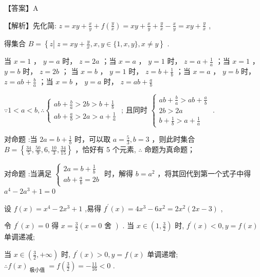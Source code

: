 \documentclass[10pt]{article}
\newcommand*\circled[1]{\tikz[baseline=(char.base)]{\node[shape=circle,draw,inner sep=1.5pt] (char) {\small #1};}}
\begin{document}
【答案】A

【解析】先化简: \(z = {xy} + \frac{x}{y} + f\left( \frac{y}{x}\right)  = {xy} + \frac{x}{y} + \frac{y}{x} - \frac{x}{y} = {xy} + \frac{y}{x}\) ,

得集合 \(B = \left\{  {z\left| {\;z = {xy} + \frac{y}{x}}\right. ,x,y \in  \{ 1,x,y\} ,x \neq  y}\right\}\) .

当 \(x = 1\) ， \(y = a\) 时， \(z = {2a}\) ；当 \(x = a\) ， \(y = 1\) 时， \(z = a + \frac{1}{a}\) ；当 \(x = 1\) ， \(y = b\) 时， \(z = {2b}\) ； 当 \(x = b\) ， \(y = 1\) 时， \(z = b + \frac{1}{b}\) ；当 \(x = a\) ， \(y = b\) 时， \(z = {ab} + \frac{b}{a}\) ；当 \(x = b\) ， \(y = a\) 时， \(z = {ab} + \frac{a}{b}\)

\(\because 1 < a < b,\therefore \left\{  \begin{array}{l} {ab} + \frac{b}{a} > {2b} > b + \frac{1}{b} \\  {ab} + \frac{a}{b} > {2a} > a + \frac{1}{a} \end{array}\right.\) ; 且同时 \(\left\{  \begin{array}{l} {ab} + \frac{b}{a} > {ab} + \frac{a}{b} \\  {2b} > {2a} \\  b + \frac{1}{b} > a + \frac{1}{a} \end{array}\right.\) .

对命题 \circled{1} :当 \({2a} = b + \frac{1}{b}\) 时，可以取 \(a = \frac{5}{3},b = 3\) ，则此时集合 \(B = \left\{  {\frac{34}{5},\frac{50}{9},6,\frac{10}{3},\frac{34}{15}}\right\}\) ，恰好有 5 个元素, \(\therefore\)  \circled{1} 命题为真命题；

对命题 \circled{2} :当满足 \(\left\{  \begin{array}{l} {2a} = b + \frac{1}{b} \\  {ab} + \frac{a}{b} = {2b} \end{array}\right.\) 时，解得 \(b = {a}^{2}\) ，将其回代到第一个式子中得 \({a}^{4} - 2{a}^{3} + 1 = 0\)

设 \(f\left( x\right)  = {x}^{4} - 2{x}^{3} + 1\) ,易得 \({f}^{\prime }\left( x\right)  = 4{x}^{3} - 6{x}^{2} = 2{x}^{2}\left( {{2x} - 3}\right)\) ,

令 \({f}^{\prime }\left( x\right)  = 0\) 得 \(x = \frac{3}{2}\left( {x = 0\text{ 舍 }}\right)\) . 当 \(x \in  \left( {1,\frac{3}{2}}\right)\) 时, \({f}^{\prime }\left( x\right)  < 0,y = f\left( x\right)\) 单调递减;

当 \(x \in  \left( {\frac{3}{2}, + \infty }\right)\) 时, \({f}^{\prime }\left( x\right)  > 0,y = f\left( x\right)\) 单调递增; \(\therefore f{\left( x\right) }_{\text{ 极小值 }} = f\left( \frac{3}{2}\right)  =  - \frac{11}{16} < 0\) .
\end{document}
